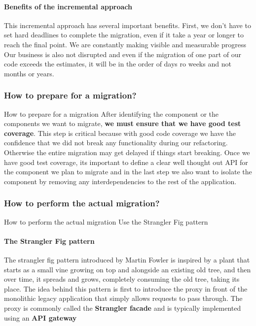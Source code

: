 \documentclass[a4paper, 11pt]{book}
\begin{document}
    \paragraph{Benefits of the incremental approach}
    This incremental approach has several important benefits.
    First, we don't have to set hard deadlines to complete the migration, even if it take a year or longer to reach the final point.
    We are constantly making visible and measurable progress
    Our business is also not disrupted and even if the migration of one part of our code exceeds the estimates, it will be in the order of days ro weeks and not months or years.

    \subsubsection{How to prepare for a migration?}
    How to prepare for a migration
    After identifying the component or the components we want to migrate, \textbf{we must ensure that we have good test coverage}.
    This step is critical because with good code coverage we have the confidence that we did not break any functionality during our refactoring.
    Otherwise the entire migration may get delayed if things start breaking.
    Once we have good test coverage, its important to define a clear well thought out API for the component we plan to migrate and in the last step we also want to isolate the component by removing any interdependencies to the rest of the application.

    \subsubsection{How to perform the actual migration?}
    How to perform the actual migration
    Use the Strangler Fig pattern

    \paragraph{The Strangler Fig pattern}
    The strangler fig pattern introduced by Martin Fowler is inspired by a plant that starts as a small vine growing on top and alongside an existing old tree, and then over time, it spreads and grows, completely consuming the old tree, taking its place.
    The idea behind this pattern is first to introduce the proxy in front of the monolithic legacy application that simply allows requests to pass through.
    The proxy is commonly called the \textbf{Strangler facade} and is typically implemented using an \textbf{API gateway}
\end{document}
